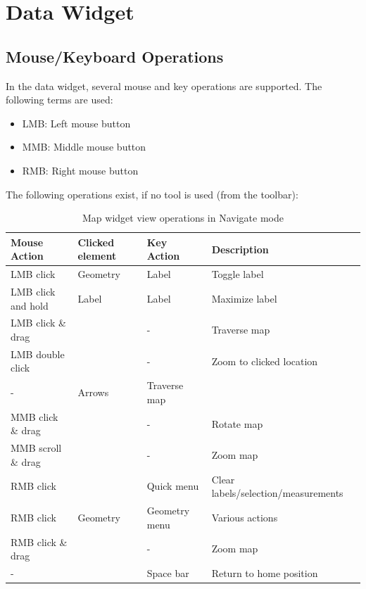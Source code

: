 \section{Data Widget}
\label{sec:osgview_data}

\subsection{Mouse/Keyboard Operations}
In the data widget, several mouse and key operations are supported. The following terms are used:

\begin{itemize}
 \item LMB: Left mouse button
 \item MMB: Middle mouse button
 \item RMB: Right mouse button
\end{itemize}

The following operations exist, if no tool is used (from the toolbar):

\begin{table}[H]
  \center
  \begin{tabular}{ | l | l | l | l |}
    \hline
    \textbf{Mouse Action} & \textbf{Clicked element} &\textbf{Key Action} &  \textbf{Description} \\ \hline
    LMB click & Geometry & Label & Toggle label \\ \hline
    LMB click and hold & Label & Label & Maximize label \\ \hline
    LMB click \& drag & & - & Traverse map \\ \hline
    LMB double click & & - & Zoom to clicked location \\ \hline
    - & Arrows & Traverse map \\ \hline
    MMB click \& drag & & - & Rotate map \\ \hline
    MMB scroll \& drag & & - & Zoom map \\ \hline
    RMB click & & Quick menu & Clear labels/selection/measurements \\ \hline
    RMB click & Geometry & Geometry menu & Various actions \\ \hline
    RMB click \& drag & & - & Zoom map \\ \hline
    - & & Space bar & Return to home position \\ \hline
  \end{tabular}
  \caption{Map widget view operations in Navigate mode}
\end{table}

